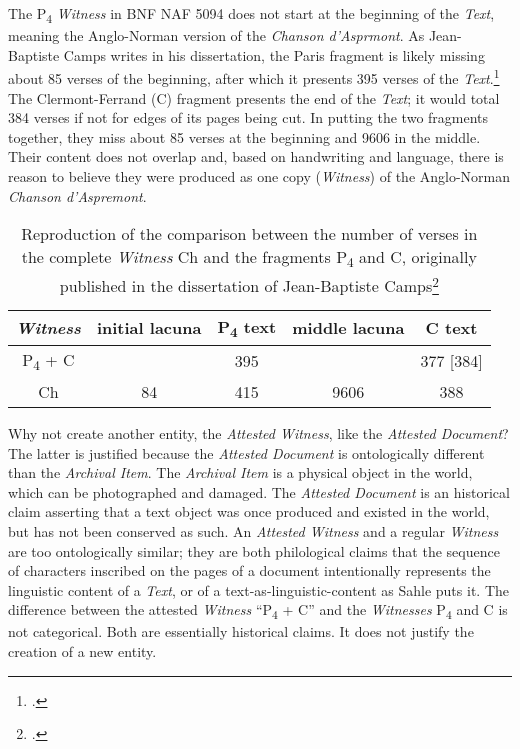 The P\textsubscript{4} \textit{Witness} in BNF NAF 5094 does not start at the beginning of the \textit{Text}, meaning the Anglo-Norman version of the \textit{Chanson d'Asprmont}. As Jean-Baptiste Camps writes in his dissertation, the Paris fragment is likely missing about 85 verses of the beginning, after which it presents 395 verses of the \textit{Text}.\footcite[][xcvi]{camps2016} The Clermont-Ferrand (C) fragment presents the end of the \textit{Text}; it would total 384 verses if not for edges of its pages being cut. In putting the two fragments together, they miss about 85 verses at the beginning and 9606 in the middle. Their content does not overlap and, based on handwriting and language, there is reason to believe they were produced as one copy (\textit{Witness}) of the Anglo-Norman \textit{Chanson d'Aspremont}.

\begin{table}[ht]
    \begin{center}
    \begin{tabular}{c||cccc}
        \textit{Witness} & initial lacuna & P\textsubscript{4} text & middle lacuna & C text \\
        \hline
        \hline
        P\textsubscript{4} + C & & 395 & & 377 [384] \\
        Ch & 84 & 415 & 9606 & 388
    \end{tabular}
    \end{center}
\caption{Reproduction of the comparison between the number of verses in the complete \textit{Witness} Ch and the fragments P\textsubscript{4} and C, originally published in the dissertation of Jean-Baptiste Camps\footcite[Table 1.3.][xcvii]{camps2016}}
\label{tab:CampsAspremont}
\end{table}

Why not create another entity, the \textit{Attested Witness}, like the \textit{Attested Document}?\footnotemark{} The latter is justified because the \textit{Attested Document} is ontologically different than the \textit{Archival Item}. The \textit{Archival Item} is a physical object in the world, which can be photographed and damaged. The \textit{Attested Document} is an historical claim asserting that a text object was once produced and existed in the world, but has not been conserved as such. An \textit{Attested Witness} and a regular \textit{Witness} are too ontologically similar; they are both philological claims that the sequence of characters inscribed on the pages of a document intentionally represents the linguistic content of a \textit{Text}, or of a text-as-linguistic-content as Sahle puts it. The difference between the attested \textit{Witness} ``P\textsubscript{4} + C'' and the \textit{Witnesses} P\textsubscript{4} and C is not categorical. Both are essentially historical claims. It does not justify the creation of a new entity.

